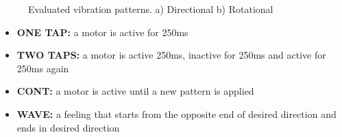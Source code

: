 \begin{figure}[ht!]
\centering
%
    \caption{%
	Evaluated vibration patterns. a) Directional b) Rotational
     }%
   \label{fig:directional_rotational}
\end{figure}

\begin{itemize}
\item{\textbf{ONE TAP:} a motor is active for 250ms}
\item{\textbf{TWO TAPS:} a motor is active 250ms, inactive for 250ms and active for 250ms again}
\item{\textbf{CONT:} a motor is active until a new pattern is applied}
\item{\textbf{WAVE:} a feeling that starts from the opposite end of desired direction and ends in desired direction}
\end{itemize}

